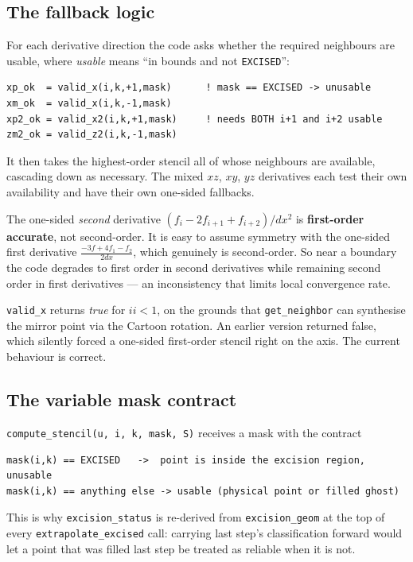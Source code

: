 \documentclass[11pt,openany]{book}
\begin{document}
\subsection{The fallback logic}

For each derivative direction the code asks whether the required neighbours are
usable, where \emph{usable} means ``in bounds and not \texttt{EXCISED}'':
\begin{lstlisting}
xp_ok  = valid_x(i,k,+1,mask)      ! mask == EXCISED -> unusable
xm_ok  = valid_x(i,k,-1,mask)
xp2_ok = valid_x2(i,k,+1,mask)     ! needs BOTH i+1 and i+2 usable
zm2_ok = valid_z2(i,k,-1,mask)
\end{lstlisting}
It then takes the highest-order stencil all of whose neighbours are available,
cascading down as necessary. The mixed $xz$, $xy$, $yz$ derivatives each test
their own availability and have their own one-sided fallbacks.

\gotcha
The one-sided \emph{second} derivative $(f_i - 2f_{i+1} + f_{i+2})/dx^2$ is
\textbf{first-order accurate}, not second-order. It is easy to assume symmetry
with the one-sided first derivative $\frac{-3f+4f_1-f_2}{2dx}$, which genuinely is
second-order. So near a boundary the code degrades to first order in
second derivatives while remaining second order in first derivatives --- an
inconsistency that limits local convergence rate.

\gotcha
\texttt{valid\_x} returns \emph{true} for $ii < 1$, on the grounds that
\texttt{get\_neighbor} can synthesise the mirror point via the Cartoon
rotation. An earlier version returned false, which silently forced a one-sided
first-order stencil right on the axis. The current behaviour is correct.

\subsection{The variable mask contract}

\texttt{compute\_stencil(u, i, k, mask, S)} receives a mask with the
contract
\begin{lstlisting}
mask(i,k) == EXCISED   ->  point is inside the excision region, unusable
mask(i,k) == anything else -> usable (physical point or filled ghost)
\end{lstlisting}
This is why \texttt{excision\_status} is re-derived from
\texttt{excision\_geom} at the top of every \texttt{extrapolate\_excised}
call: carrying last step's classification forward would let a point that was
filled last step be treated as reliable when it is not.
\end{document}
